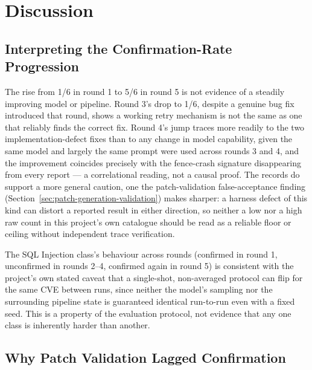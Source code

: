\documentclass[12pt,a4paper]{report}
\begin{document}
\section{Discussion}

\subsection{Interpreting the Confirmation-Rate Progression}
\label{sec:confirmation-rate-progression}

The rise from 1/6 in round 1 to 5/6 in round 5 is not evidence of a steadily improving model or pipeline. Round 3's drop to 1/6, despite a genuine bug fix introduced that round, shows a working retry mechanism is not the same as one that reliably finds the correct fix. Round 4's jump traces more readily to the two implementation-defect fixes than to any change in model capability, given the same model and largely the same prompt were used across rounds 3 and 4, and the improvement coincides precisely with the fence-crash signature disappearing from every report — a correlational reading, not a causal proof. The records do support a more general caution, one the patch-validation false-acceptance finding (Section~\ref{sec:patch-generation-validation}) makes sharper: a harness defect of this kind can distort a reported result in either direction, so neither a low nor a high raw count in this project's own catalogue should be read as a reliable floor or ceiling without independent trace verification.

The SQL Injection class's behaviour across rounds (confirmed in round 1, unconfirmed in rounds 2--4, confirmed again in round 5) is consistent with the project's own stated caveat that a single-shot, non-averaged protocol can flip for the same CVE between runs, since neither the model's sampling nor the surrounding pipeline state is guaranteed identical run-to-run even with a fixed seed. This is a property of the evaluation protocol, not evidence that any one class is inherently harder than another.

\subsection{Why Patch Validation Lagged Confirmation}
\label{sec:patch-validation-lag}
\end{document}
